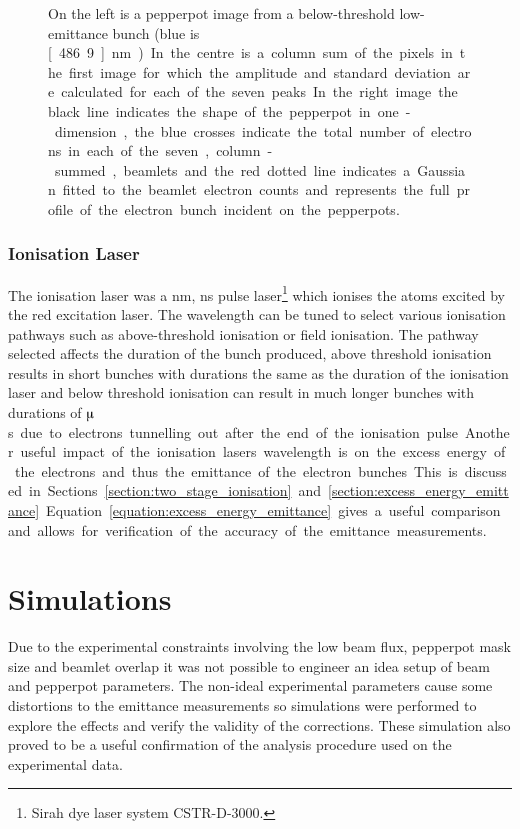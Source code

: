 \begin{figure}
    \center
    
    \caption[Determining the beam profile from a pepperpot measurement.]{On the left is a pepperpot image from a below-threshold low-emittance bunch (blue is \unit[486.9]{nm}). In the centre is a column sum of the pixels in the first image for which the amplitude and standard deviation are calculated for each of the seven peaks. In the right image the black line indicates the shape of the pepperpot in one-dimension, the blue crosses indicate the total number of electrons in each of the seven, column-summed, beamlets and the red dotted line indicates a Gaussian fitted to the beamlet electron counts and represents the full profile of the electron bunch incident on the pepperpots.}
    \label{figure:pepperpot_profile}
\end{figure}

\subsubsection{Ionisation Laser}
The ionisation laser was a \unit[457-493]{nm}, \unit[5]{ns} pulse laser\footnote{Sirah dye laser system CSTR-D-3000.} which ionises the atoms excited by the red excitation laser.
The wavelength can be tuned to select various ionisation pathways such as above-threshold ionisation or field ionisation.
The pathway selected affects the duration of the bunch produced, above threshold ionisation results in short bunches with durations the same as the duration of the ionisation laser and below threshold ionisation can result in much longer bunches with durations of \unit[10s]{$\muup$s} due to electrons tunnelling out after the end of the ionisation pulse.

Another useful impact of the ionisation lasers wavelength is on the excess energy of the electrons and thus the emittance of the electron bunches.
This is discussed in Sections~\ref{section:two_stage_ionisation} and \ref{section:excess_energy_emittance}.
Equation~\ref{equation:excess_energy_emittance} gives a useful comparison and allows for verification of the accuracy of the emittance measurements.

\section{Simulations}\label{section:pepperpot_simulations}

Due to the experimental constraints involving the low beam flux, pepperpot mask size and beamlet overlap it was not possible to engineer an idea setup of beam and pepperpot parameters.
The non-ideal experimental parameters cause some distortions to the emittance measurements so simulations were performed to explore the effects and verify the validity of the corrections.
These simulation also proved to be a useful confirmation of the analysis procedure used on the experimental data.

